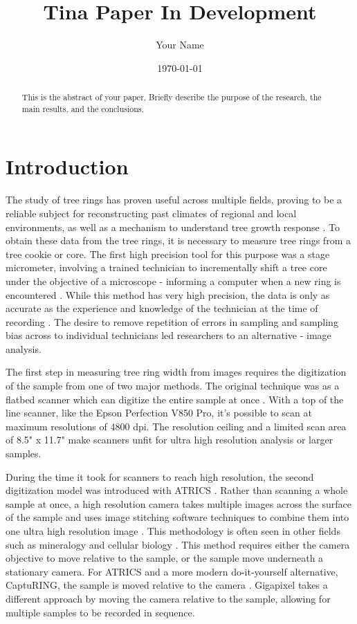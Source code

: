 \documentclass[a4paper,12pt]{article}
\title{Tina Paper In Development}
\author{Your Name}
\date{\today}
\begin{document}
\maketitle

\begin{abstract}
    This is the abstract of your paper. Briefly describe the purpose of the research, the main results, and the conclusions.
\end{abstract}

\section{Introduction}
The study of tree rings has proven useful across multiple fields, proving to be a reliable subject for reconstructing past climates of regional and local environments, as well as a mechanism to understand tree growth response \citep{fritts_dendroclimatology_1971} \citep{williams_using_2010} \citep{guibal_dendrochronology_2021} \citep{sheppard_dendroclimatology_2010}.
To obtain these data from the tree rings, it is necessary to measure tree rings from a tree cookie or core. The first high precision tool for this purpose was a stage micrometer, involving a trained technician to incrementally shift a tree core under the objective of a microscope - informing a computer when a new ring is encountered \citep{robinson_microcomputer_nodate}.
While this method has very high precision, the data is only as accurate as the experience and knowledge of the technician at the time of recording \citep{levanic_atrics_2007}.
The desire to remove repetition of errors in sampling and sampling bias across to individual technicians led researchers to an alternative - image analysis. 
\par
The first step in measuring tree ring width from images requires the digitization of the sample from one of two major methods.  
The original technique was as a flatbed scanner which can digitize the entire sample at once \citep{guay_new_1992}. 
With a top of the line scanner, like the Epson Perfection V850 Pro, it's possible to scan at maximum resolutions of 4800 dpi. 
The resolution ceiling and a limited scan area of 8.5" x 11.7" make scanners unfit for ultra high resolution analysis or larger samples. 

During the time it took for scanners to reach high resolution, the second digitization model was introduced with ATRICS \citep{levanic_atrics_2007}. 
Rather than scanning a whole sample at once, a high resolution camera takes multiple images across the surface of the sample and uses image stitching software techniques to combine them into one ultra high resolution image \citep{muhlich_stitching_2022}.
This methodology is often seen in other fields such as mineralogy and cellular biology \citep{ro_image_2021,mohammadi_fast_2024}. 
This method requires either the camera objective to move relative to the sample, or the sample move underneath a stationary camera. 
For ATRICS and a more modern do-it-yourself alternative, CaptuRING, the sample is moved relative to the camera \citep{garcia-hidalgo_capturing_2022}. 
Gigapixel takes a different approach by moving the camera relative to the sample, allowing for multiple samples to be recorded in sequence. 
\end{document}
